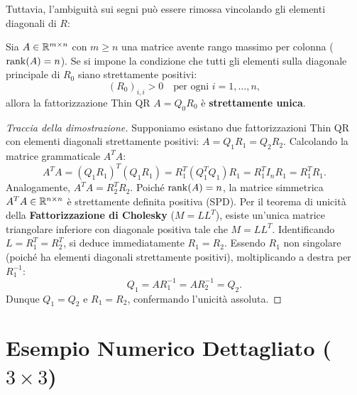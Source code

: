 Tuttavia, l'ambiguit\`a sui segni pu\`o essere rimossa vincolando gli elementi diagonali di $R$:

\begin{theorem}
\label{thm:qr-unicita-condizionata}
Sia $A \in \mathbb{R}^{m \times n}$ con $m \ge n$ una matrice avente rango massimo per colonna ($\operatorname{rank}(A) = n$).
Se si impone la condizione che tutti gli elementi sulla diagonale principale di $R_0$ siano strettamente positivi:
\begin{equation}
    (R_0)_{i,i} > 0 \quad \text{per ogni } i = 1, \dots, n,
\end{equation}
allora la fattorizzazione Thin QR $A = Q_0 R_0$ \`e \textbf{strettamente unica}.
\end{theorem}

\begin{proof}[Traccia della dimostrazione]
Supponiamo esistano due fattorizzazioni Thin QR con elementi diagonali strettamente positivi: $A = Q_1 R_1 = Q_2 R_2$.
Calcolando la matrice grammaticale $A^T A$:
\begin{equation}
    A^T A = (Q_1 R_1)^T (Q_1 R_1) = R_1^T (Q_1^T Q_1) R_1 = R_1^T I_n R_1 = R_1^T R_1.
\end{equation}
Analogamente, $A^T A = R_2^T R_2$. 
Poich\'e $\operatorname{rank}(A) = n$, la matrice simmetrica $A^T A \in \mathbb{R}^{n \times n}$ \`e strettamente definita positiva (SPD). Per il teorema di unicit\`a della \textbf{Fattorizzazione di Cholesky} ($M = L L^T$), esiste un'unica matrice triangolare inferiore con diagonale positiva tale che $M = L L^T$.
Identificando $L = R_1^T = R_2^T$, si deduce immediatamente $R_1 = R_2$.
Essendo $R_1$ non singolare (poich\'e ha elementi diagonali strettamente positivi), moltiplicando a destra per $R_1^{-1}$:
\begin{equation}
    Q_1 = A R_1^{-1} = A R_2^{-1} = Q_2.
\end{equation}
Dunque $Q_1 = Q_2$ e $R_1 = R_2$, confermando l'unicit\`a assoluta.
\end{proof}

\FloatBarrier
\section[Esempio Numerico Dettagliato (3x3)]{Esempio Numerico Dettagliato (\texorpdfstring{$3 \times 3$}{3x3})}
\label{sec:esempio-numerico-3x3}

